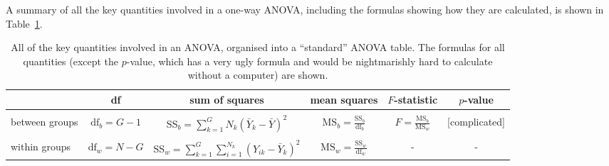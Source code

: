 A summary of all the key quantities involved in a one-way ANOVA, including the formulas showing how they are calculated, is shown in Table~\ref{tab:anovatable}. 
\begin{table}
\begin{center}
\caption{All of the key quantities involved in an ANOVA, organised into a ``standard'' ANOVA table. The formulas for all quantities (except the $p$-value, which has a very ugly formula and would be nightmarishly hard to calculate without a computer) are shown.} \tabcapsep
\label{tab:anovatable}
\small
\begin{tabular}{l|c|c|c|c|c} 
& df & sum of squares & mean squares & $F$-statistic & $p$-value \\  \hline  &&&&& \\ 
between groups & $\mbox{df}_b = G-1$ & SS$_b = \displaystyle\sum_{k=1}^G N_k (\bar{Y}_k - \bar{Y})^2$ & $\mbox{MS}_b = \displaystyle\frac{\mbox{SS}_b}{\mbox{df}_b}$ & $ F = \displaystyle\frac{\mbox{MS}_b }{ \mbox{MS}_w }$ & [complicated] \\ &&&&&\\
within groups   & $\mbox{df}_w = N-G$ & SS$_w = \displaystyle\sum_{k=1}^G \displaystyle\sum_{i = 1}^{N_k} ( {Y}_{ik} - \bar{Y}_k)^2$ & $\mbox{MS}_w =  \displaystyle\frac{\mbox{SS}_w}{\mbox{df}_w}$ & - & - \\ 
\end{tabular}\tabcapsep
\HR
\end{center}
\end{table}


